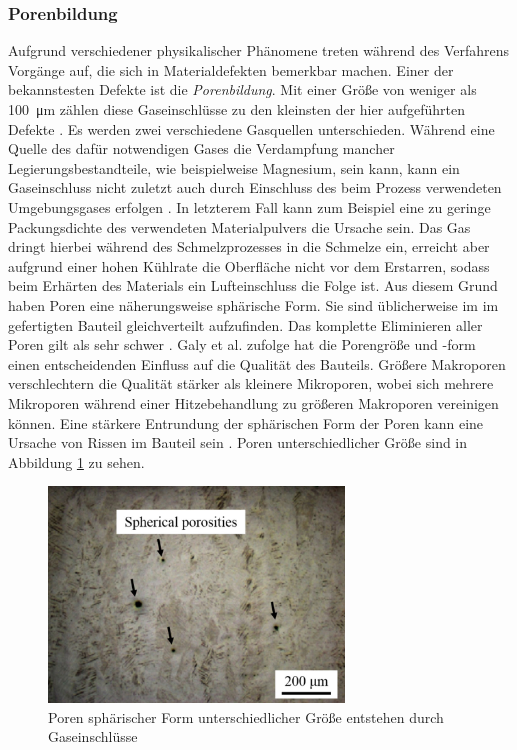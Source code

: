 		\subsubsection{Porenbildung}
		Aufgrund verschiedener physikalischer Phänomene treten während des Verfahrens Vorgänge auf,
		die sich in Materialdefekten bemerkbar machen. Einer der bekannstesten Defekte ist die
		\emph{Porenbildung}. Mit einer Größe von weniger als \SI{100}{\micro\meter} zählen diese
		Gaseinschlüsse zu den kleinsten der hier aufgeführten Defekte \cite{zhang2017defect}. Es
		werden zwei verschiedene Gasquellen unterschieden. Während eine Quelle des dafür
		notwendigen Gases die Verdampfung mancher Legierungsbestandteile, wie beispielweise
		Magnesium, sein kann, kann ein Gaseinschluss nicht zuletzt auch durch Einschluss des beim
		Prozess verwendeten Umgebungsgases erfolgen \cite{galy2018main}. In letzterem Fall kann
		zum Beispiel eine zu geringe Packungsdichte des verwendeten Materialpulvers die Ursache
		sein. Das Gas dringt hierbei während des Schmelzprozesses in die Schmelze ein, erreicht
		aber aufgrund einer hohen Kühlrate die Oberfläche nicht vor dem Erstarren, sodass beim
		Erhärten des Materials ein Lufteinschluss die Folge ist. Aus diesem Grund haben Poren eine
		näherungsweise sphärische Form. Sie sind üblicherweise im im gefertigten Bauteil
		gleichverteilt aufzufinden. Das komplette Eliminieren aller Poren gilt als sehr schwer
		\cite{zhang2017defect}. Galy et al. zufolge hat die Porengröße und -form einen
		entscheidenden Einfluss auf die Qualität des Bauteils. Größere Makroporen verschlechtern
		die Qualität stärker als kleinere Mikroporen, wobei sich mehrere Mikroporen während einer
		Hitzebehandlung zu größeren Makroporen vereinigen können. Eine stärkere Entrundung der
		sphärischen Form der Poren kann eine Ursache von Rissen im Bauteil sein
		\cite{galy2018main}. Poren unterschiedlicher Größe sind in Abbildung
		\ref{fig:defects_porosities} zu sehen.

		\begin{figure}[!ht]
			\centering
			\includegraphics[width=0.7\textwidth]{chapter/main/img/defects/porosities.png}
			\caption{Poren sphärischer Form unterschiedlicher Größe entstehen durch Gaseinschlüsse
			\cite{zhang2017defect}}
			\label{fig:defects_porosities}
		\end{figure}

